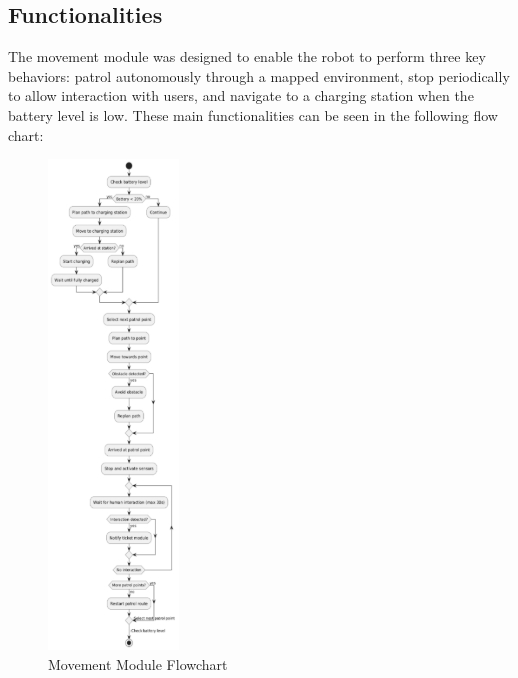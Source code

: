 \subsection{Functionalities}

The movement module was designed to enable the robot to perform three key behaviors: patrol autonomously through a mapped environment, stop periodically to allow interaction with users, and navigate to a charging station when the battery level is low. These main functionalities can be seen in the following flow chart:

\begin{figure}[H]
    \centering
    \includegraphics[width=0.3\linewidth]{../ReportMovementModule/images/Aspose.Words.728084da-df58-4b9d-a372-f65cffbdb23d.007.jpeg}
    \caption{Movement Module Flowchart}
\end{figure}

